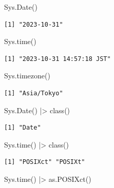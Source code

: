 \documentclass[
  letterpaper,
  DIV=11,
  numbers=noendperiod]{scrreprt}
\newenvironment{Shaded}{\begin{snugshade}}{\end{snugshade}}
\newcommand{\FunctionTok}[1]{\textcolor[rgb]{0.28,0.35,0.67}{#1}}
\newcommand{\NormalTok}[1]{\textcolor[rgb]{0.00,0.23,0.31}{#1}}
\newcommand{\SpecialCharTok}[1]{\textcolor[rgb]{0.37,0.37,0.37}{#1}}
\begin{document}
\begin{Shaded}
\begin{Highlighting}[]
\FunctionTok{Sys.Date}\NormalTok{()}
\end{Highlighting}
\end{Shaded}

\begin{verbatim}
[1] "2023-10-31"
\end{verbatim}

\begin{Shaded}
\begin{Highlighting}[]
\FunctionTok{Sys.time}\NormalTok{()}
\end{Highlighting}
\end{Shaded}

\begin{verbatim}
[1] "2023-10-31 14:57:18 JST"
\end{verbatim}

\begin{Shaded}
\begin{Highlighting}[]
\FunctionTok{Sys.timezone}\NormalTok{()}
\end{Highlighting}
\end{Shaded}

\begin{verbatim}
[1] "Asia/Tokyo"
\end{verbatim}

\begin{Shaded}
\begin{Highlighting}[]
\FunctionTok{Sys.Date}\NormalTok{() }\SpecialCharTok{|\textgreater{}} \FunctionTok{class}\NormalTok{()}
\end{Highlighting}
\end{Shaded}

\begin{verbatim}
[1] "Date"
\end{verbatim}

\begin{Shaded}
\begin{Highlighting}[]
\FunctionTok{Sys.time}\NormalTok{() }\SpecialCharTok{|\textgreater{}} \FunctionTok{class}\NormalTok{()}
\end{Highlighting}
\end{Shaded}

\begin{verbatim}
[1] "POSIXct" "POSIXt" 
\end{verbatim}

\begin{Shaded}
\begin{Highlighting}[]
\FunctionTok{Sys.time}\NormalTok{() }\SpecialCharTok{|\textgreater{}} \FunctionTok{as.POSIXct}\NormalTok{()}
\end{Highlighting}
\end{Shaded}
\end{document}
